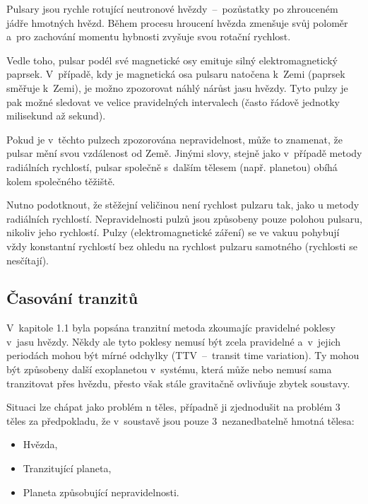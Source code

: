 \documentclass[a4paper,12pt]{article}
\begin{document}
{{{Pulsary jsou rychle rotující neutronové hvězdy~--~pozůstatky po zhrouceném jádře hmotných hvězd. Během procesu hroucení hvězda zmenšuje svůj poloměr a~pro zachování momentu hybnosti zvyšuje svou rotační rychlost.~\cite{methods}

Vedle toho, pulsar podél své magnetické osy emituje silný elektromagnetický paprsek. V~případě, kdy je magnetická osa pulsaru natočena k~Zemi (paprsek směřuje k~Zemi), je možno zpozorovat náhlý nárůst jasu hvězdy. Tyto pulzy je pak možné sledovat ve velice pravidelných intervalech (často řádově jednotky milisekund až sekund).~\cite{methods}

Pokud je v~těchto pulzech zpozorována nepravidelnost, může to znamenat, že pulsar mění svou vzdálenost od Země. Jinými slovy, stejně jako v~případě metody radiálních rychlostí, pulsar společně s~dalším tělesem (např. planetou) obíhá kolem společného těžiště.~\cite{methods}

Nutno podotknout, že stěžejní veličinou není rychlost pulzaru tak, jako u metody radiálních rychlostí. Nepravidelnosti pulzů jsou způsobeny pouze polohou pulsaru, nikoliv jeho rychlostí. Pulzy (elektromagnetické záření) se ve vakuu pohybují vždy konstantní rychlostí bez ohledu na rychlost pulzaru samotného (rychlosti se nesčítají).

\drawgimp

\clearpage
\subsection{Časování tranzitů}


V~kapitole 1.1 byla popsána tranzitní metoda zkoumajíc pravidelné poklesy v~jasu hvězdy. Někdy ale tyto poklesy nemusí být zcela pravidelné a~v~jejich periodách mohou být mírné odchylky (TTV~--~transit time variation). Ty mohou být způsobeny další exoplanetou v~systému, která může nebo nemusí sama tranzitovat přes hvězdu, přesto však stále gravitačně ovlivňuje zbytek soustavy.~\cite{ttv}

Situaci lze chápat jako problém n těles, případně ji zjednodušit na problém 3 těles za předpokladu, že v~soustavě jsou pouze 3~nezanedbatelně hmotná tělesa:

\begin{itemize}
\item Hvězda,
\item Tranzitující planeta,
\item Planeta způsobující nepravidelnosti.
\end{itemize}

}}}
\end{document}
